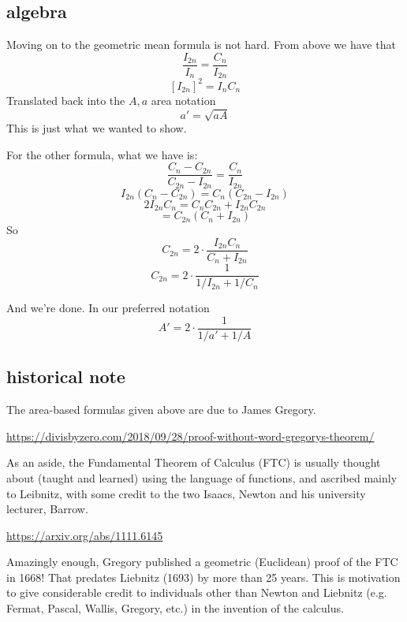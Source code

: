 \documentclass[11pt, oneside]{article}
\begin{document}
\subsection*{algebra}
Moving on to the geometric mean formula is not hard.  From above we have that
\[ \frac{I_{2n}}{I_n} = \frac{C_n}{I_{2n}}   \]
\[ [I_{2n}]^2 = I_n C_n  \]
Translated back into the $A,a$ area notation
\[ a' = \sqrt{aA} \]
This is just what we wanted to show.

For the other formula, what we have is:
\[ \frac{C_n - C_{2n}}{C_{2n} - I_{2n}} = \frac{C_n}{I_{2n}}   \]
\[ I_{2n} (C_n - C_{2n}) = C_n (C_{2n} - I_{2n}) \]
\[ 2 I_{2n} C_n = C_n C_{2n} + I_{2n} C_{2n} \]
\[ = C_{2n}(C_{n} + I_{2n}) \]
So
\[ C_{2n}  = 2 \cdot \frac{I_{2n} C_n} {C_{n} + I_{2n}}  \]
\[ C_{2n} = 2 \cdot \frac{1}{1/I_{2n} + 1/C_n} \]

And we're done.  In our preferred notation
\[ A' = 2 \cdot \frac{1}{1/a' + 1/A} \]

\subsection*{historical note}

The area-based formulas given above are due to James Gregory.

\url{https://divisbyzero.com/2018/09/28/proof-without-word-gregorys-theorem/}

As an aside, the Fundamental Theorem of Calculus (FTC) is usually thought about (taught and learned) using the language of functions, and ascribed mainly to Leibnitz, with some credit to the two Isaacs, Newton and his university lecturer, Barrow.

\url{https://arxiv.org/abs/1111.6145}

Amazingly enough, Gregory published a geometric (Euclidean) proof of the FTC in 1668!  That predates Liebnitz (1693) by more than 25 years.  This is motivation to give considerable credit to individuals other than Newton and Liebnitz (e.g. Fermat, Pascal, Wallis, Gregory, etc.) in the invention of the calculus.
\end{document}
